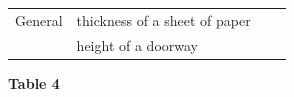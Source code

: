 {{\begin{center}
\begin{tabular}[t]{|l|l|l|l|}
    
        General &
    
    
        thickness of a sheet of paper &
    
    
         &
    
    
     \tabularnewline\cline{1-1}\cline{2-2}\cline{3-3}\cline{4-4}
    
    
         &
    
    
        height of a doorway &
    
    
         &
    
    
     \tabularnewline\cline{1-1}\cline{2-2}\cline{3-3}\cline{4-4}
    \end{tabular}
      \end{center}
    \begin{center}{\small\bfseries Table 4}\end{center}
    
}}
